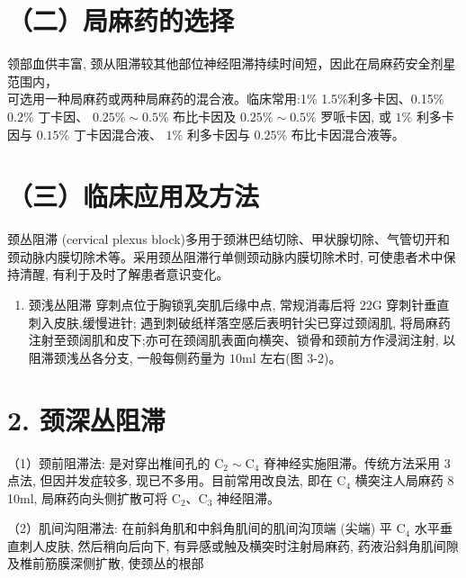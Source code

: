 \documentclass[10pt]{article}
\begin{document}
\section*{（二）局麻药的选择}
领部血供丰富, 颈从阻滞较其他部位神经阻滞持续时间短，因此在局麻药安全剂星范围内，\\
可选用一种局麻药或两种局麻药的混合液。临床常用:1\% 1.5\%利多卡因、0.15\% $0.2 \%$ 丁卡因、 $0.25 \% \sim 0.5 \%$ 布比卡因及 $0.25 \% \sim 0.5 \%$ 罗哌卡因, 或 $1 \%$ 利多卡因与 $0.15 \%$ 丁卡因混合液、 $1 \%$ 利多卡因与 $0.25 \%$ 布比卡因混合液等。

\section*{（三）临床应用及方法}
颈丛阻滞 (cervical plexus block)多用于颈淋巴结切除、甲状腺切除、气管切开和颈动脉内膜切除术等。采用颈丛阻滞行单侧颈动脉内膜切除术时, 可使患者术中保持清醒, 有利于及时了解患者意识变化。

\begin{enumerate}
  \item 颈浅丛阻滞 穿刺点位于胸锁乳突肌后缘中点, 常规消毒后将 $22 \mathrm{G}$ 穿刺针垂直刺入皮肤,缓慢进针; 遇到刺破纸样落空感后表明针尖已穿过颈阔肌, 将局麻药注射至颈阔肌和皮下;亦可在颈阔肌表面向横突、锁骨和颈前方作浸润注射, 以阻滞颈浅丛各分支, 一般每侧药量为 $10 \mathrm{ml}$ 左右(图 3-2)。
\end{enumerate}

\section*{2. 颈深丛阻滞}
（1）颈前阻滞法: 是对穿出椎间孔的 $\mathrm{C}_{2} \sim \mathrm{C}_{4}$ 脊神经实施阻滞。传统方法采用 3 点法, 但因并发症较多, 现已不多用。目前常用改良法, 即在 $\mathrm{C}_{4}$ 横突注人局麻药 8 10ml, 局麻药向头侧扩散可将 $\mathrm{C}_{2} 、 \mathrm{C}_{3}$ 神经阻滞。

（2）肌间沟阻滞法: 在前斜角肌和中斜角肌间的肌间沟顶端 (尖端) 平 $\mathrm{C}_{4}$ 水平垂直刺人皮肤, 然后稍向后向下, 有异感或触及横突时注射局麻药, 药液沿斜角肌间隙及椎前筋膜深侧扩散, 使颈丛的根部
\end{document}
